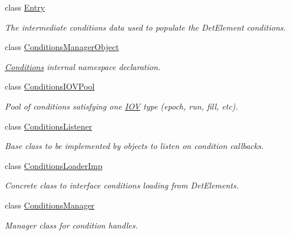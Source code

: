 \begin{DoxyCompactItemize}
class \hyperlink{class_d_d4hep_1_1_conditions_1_1_entry}{Entry}
\begin{DoxyCompactList}\small\item\em The intermediate conditions data used to populate the DetElement conditions. \item\end{DoxyCompactList}\item 
class \hyperlink{class_d_d4hep_1_1_conditions_1_1_conditions_manager_object}{ConditionsManagerObject}
\begin{DoxyCompactList}\small\item\em \hyperlink{namespace_d_d4hep_1_1_conditions}{Conditions} internal namespace declaration. \item\end{DoxyCompactList}\item 
class \hyperlink{class_d_d4hep_1_1_conditions_1_1_conditions_i_o_v_pool}{ConditionsIOVPool}
\begin{DoxyCompactList}\small\item\em Pool of conditions satisfying one \hyperlink{class_d_d4hep_1_1_i_o_v}{IOV} type (epoch, run, fill, etc). \item\end{DoxyCompactList}\item 
class \hyperlink{class_d_d4hep_1_1_conditions_1_1_conditions_listener}{ConditionsListener}
\begin{DoxyCompactList}\small\item\em Base class to be implemented by objects to listen on condition callbacks. \item\end{DoxyCompactList}\item 
class \hyperlink{class_d_d4hep_1_1_conditions_1_1_conditions_loader_imp}{ConditionsLoaderImp}
\begin{DoxyCompactList}\small\item\em Concrete class to interface conditions loading from DetElements. \item\end{DoxyCompactList}\item 
class \hyperlink{class_d_d4hep_1_1_conditions_1_1_conditions_manager}{ConditionsManager}
\begin{DoxyCompactList}\small\item\em Manager class for condition handles. \item\end{DoxyCompactList}\item 

\end{DoxyCompactItemize}
